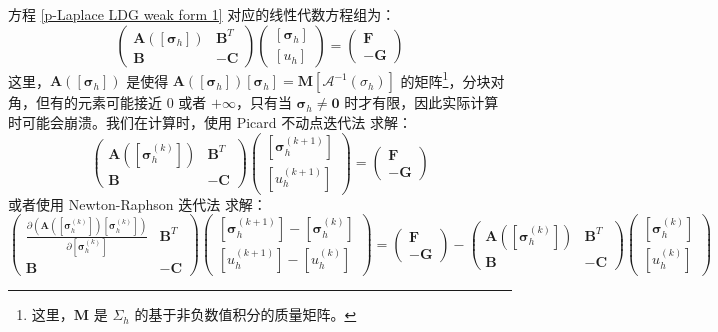 方程 \eqref{p-Laplace LDG weak form 1} 对应的线性代数方程组为：
\begin{equation}\label{p-Laplace LDG matrix equations 1}
	\begin{pmatrix}
		\bm A([\bm\sigma_{h}]) & \bm B^{T} \\
		\bm B & -\bm C
	\end{pmatrix}
	\begin{pmatrix}
		[\bm\sigma_{h}] \\
		[u_{h}]
	\end{pmatrix}
	= \begin{pmatrix}
		\bm F \\
		-\bm G
	\end{pmatrix}
\end{equation}
这里，\(\bm A([\bm\sigma_{h}])\) 是使得 \(\bm A([\bm\sigma_{h}]) [\bm\sigma_{h}] = \bm M \left[\mathcal{A}^{-1}(\sigma_{h})\right]\) 的矩阵\footnote{这里，\(\bm M\) 是 \(\Sigma_{h}\) 的基于非负数值积分的质量矩阵。}，分块对角，但有的元素可能接近 \(0\) 或者 \(+\infty\)，只有当 \(\bm\sigma_{h} \neq \bm 0\) 时才有限，因此实际计算时可能会崩溃。我们在计算时，使用 Picard 不动点迭代法 \cite{10.1016/j.cma.2006.11.023} 求解：
\begin{equation}
	\begin{pmatrix}
		\bm A([\bm\sigma_{h}^{(k)}]) & \bm B^{T} \\
		\bm B & -\bm C
	\end{pmatrix}
	\begin{pmatrix}
		[\bm\sigma_{h}^{(k+1)}] \\
		[u_{h}^{(k+1)}]
	\end{pmatrix}
	= \begin{pmatrix}
		\bm F \\
		-\bm G
	\end{pmatrix}
\end{equation}
或者使用 Newton-Raphson 迭代法 \cite{10.1002/fld.3955} 求解：
\begin{equation}
	\begin{pmatrix}
		\frac{\partial\left(\bm A([\bm\sigma_{h}^{(k)}]) [\bm\sigma_{h}^{(k)}]\right)}{\partial [\bm\sigma_{h}^{(k)}]} & \bm B^{T} \\
		\bm B & -\bm C
	\end{pmatrix}
	\begin{pmatrix}
		[\bm\sigma_{h}^{(k+1)}] - [\bm\sigma_{h}^{(k)}] \\
		[u_{h}^{(k+1)}] - [u_{h}^{(k)}]
	\end{pmatrix}
	= \begin{pmatrix}
		\bm F \\
		-\bm G
	\end{pmatrix}
	- \begin{pmatrix}
		\bm A([\bm\sigma_{h}^{(k)}]) & \bm B^{T} \\
		\bm B & -\bm C
	\end{pmatrix}
	\begin{pmatrix}
		[\bm\sigma_{h}^{(k)}] \\
		[u_{h}^{(k)}]
	\end{pmatrix}
\end{equation}

